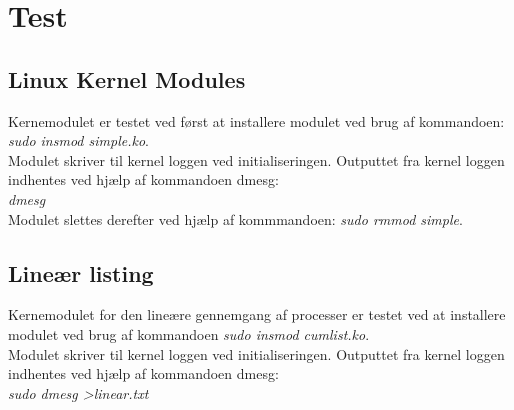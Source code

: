 \chapter{Test}
\section{Linux Kernel Modules}
Kernemodulet er testet ved først at installere modulet ved brug af kommandoen: \textit{sudo insmod simple.ko}.
\\
Modulet skriver til kernel loggen ved initialiseringen. Outputtet fra kernel loggen indhentes ved hjælp af kommandoen dmesg:\\
\textit{dmesg}
\\


Modulet slettes derefter ved hjælp af kommmandoen: \textit{sudo rmmod simple}.
\\
\section{Lineær listing}
Kernemodulet for den lineære gennemgang af processer er testet ved at installere modulet ved brug af kommandoen \textit{sudo insmod cumlist.ko}.
\\
Modulet skriver til kernel loggen ved initialiseringen. Outputtet fra kernel loggen indhentes ved hjælp af kommandoen dmesg:\\
\textit{sudo dmesg \textgreater linear.txt}
\\
\\
